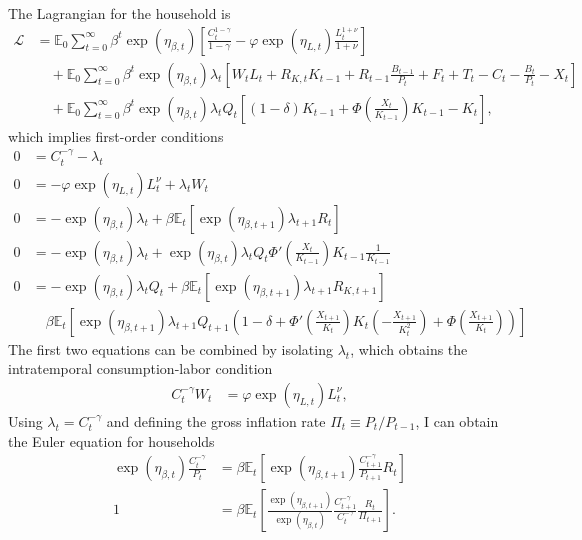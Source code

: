\documentclass[12 pt, oneside]{article}
\theoremstyle{definition}
\theoremstyle{definition}
\theoremstyle{definition}
\newcommand{\E}{\mathbb{E}}
\newcommand{\calL}{\mathcal{L}}
\begin{document}
The Lagrangian for the household is
\begin{align*}
\calL & = \E_0 \sum_{t = 0}^\infty \beta^t\exp(\eta_{\beta, t})\left[\frac{C_t^{1 - \gamma}}{1 - \gamma} - \varphi\exp(\eta_{L, t}) \frac{L_t^{1 + \nu}}{1 + \nu}\right]\\
        &\quad + \E_0 \sum_{t = 0}^\infty \beta^t\exp(\eta_{\beta, t})\lambda_t\left[ W_{t} L_t + R_{K, t} K_{t - 1} + R_{t - 1}\frac{B_{t - 1}}{P_t} + F_t + T_t - C_t -\frac{ B_t}{P_t} - X_t\right]\\
        &\quad + \E_0 \sum_{t = 0}^\infty \beta^t\exp(\eta_{\beta, t})\lambda_t Q_t\left[(1 - \delta)K_{t - 1} +\Phi\left(\frac{X_t}{K_{t - 1}}\right)K_{t - 1} - K_t\right],
\end{align*}
which implies first-order conditions
\begin{align*}
  0 & = C_t^{- \gamma} - \lambda_t\\
  0 & = -\varphi\exp(\eta_{L, t}) L_t^\nu + \lambda_t W_{t}\\
  0 & = -\exp(\eta_{\beta, t})\lambda_t + \beta \E_t[\exp(\eta_{\beta, t + 1})\lambda_{t + 1}R_t]\\
  0 & = -\exp(\eta_{\beta, t})\lambda_t + \exp(\eta_{\beta, t})\lambda_tQ_t\Phi'\left(\frac{X_t}{K_{t - 1}}\right)K_{t - 1}\frac{1}{K_{t - 1}}\\
  0 & =   - \exp(\eta_{\beta, t})\lambda_{t} Q_{t} + \beta\E_t\left[\exp(\eta_{\beta, t + 1}) \lambda_{t + 1} R_{K, t + 1}\right]\\
&\quad \beta\E_t\left[\exp(\eta_{\beta, t + 1})\lambda_{t + 1}Q_{t + 1}\left(1 - \delta  + \Phi'\left(\frac{X_{t + 1}}{K_t}\right)K_t\left(-\frac{X_{t + 1}}{K_t^2}\right) + \Phi\left(\frac{X_{t + 1}}{K_t}\right)\right)\right]
\end{align*}
The first two equations can be combined by isolating $\lambda_t$, which obtains the intratemporal consumption-labor condition
\begin{align*}
    C_t^{-\gamma} W_t & = \varphi\exp(\eta_{L, t}) L_t^\nu,
\end{align*}
Using $\lambda_t = C_t^{-\gamma}$ and defining the gross inflation rate $\Pi_t \equiv P_{t} / P_{t - 1}$, I can obtain the Euler equation for households
\begin{align*}
  \exp(\eta_{\beta, t})\frac{C_t^{-\gamma}}{P_t} & = \beta \E_t\left[\exp(\eta_{\beta, t + 1})\frac{C_{t + 1}^{-\gamma}}{P_{t + 1}}R_t\right]\\
  1 & = \beta \E_t\left[\frac{\exp(\eta_{\beta, t + 1})}{ \exp(\eta_{\beta, t})}\frac{C_{t + 1}^{-\gamma}}{ C_t^{-\gamma}}\frac{R_t}{\Pi_{t + 1}}\right].
\end{align*}
\end{document}

